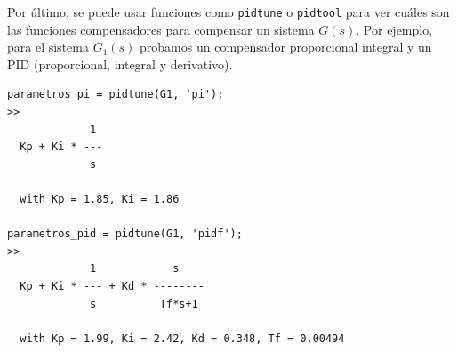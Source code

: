 Por último, se puede usar funciones como \texttt{pidtune} o \texttt{pidtool} para ver cuáles son las funciones compensadores para compensar un sistema $G(s)$. Por ejemplo, para el sistema $G_1(s)$ probamos un compensador proporcional integral y un PID (proporcional, integral y derivativo).

\begin{lstlisting}
parametros_pi = pidtune(G1, 'pi');
>>  
             1 
  Kp + Ki * ---
             s 

  with Kp = 1.85, Ki = 1.86

parametros_pid = pidtune(G1, 'pidf');
>>  
             1            s    
  Kp + Ki * --- + Kd * --------
             s          Tf*s+1 

  with Kp = 1.99, Ki = 2.42, Kd = 0.348, Tf = 0.00494
\end{lstlisting}

